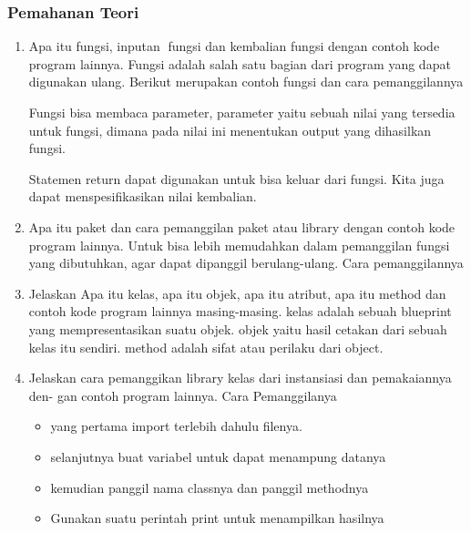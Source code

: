 \subsubsection{Pemahanan Teori}
\begin{enumerate}
    \item Apa itu fungsi, inputan fungsi dan kembalian fungsi dengan contoh kode program
    lainnya.
    Fungsi adalah salah satu bagian dari program yang dapat digunakan ulang.
    Berikut merupakan contoh fungsi dan cara pemanggilannya
    

    Fungsi bisa membaca parameter, parameter yaitu sebuah nilai yang tersedia untuk fungsi, dimana pada nilai ini menentukan output yang dihasilkan fungsi.
    

    Statemen return dapat digunakan untuk bisa keluar dari fungsi. Kita juga dapat menspesifikasikan nilai kembalian.
    

    \item Apa itu paket dan cara pemanggilan paket atau library dengan contoh kode
    program lainnya.
    Untuk bisa lebih memudahkan dalam pemanggilan fungsi yang dibutuhkan, agar dapat dipanggil berulang-ulang.
    Cara pemanggilannya
    

    \item Jelaskan Apa itu kelas, apa itu objek, apa itu atribut, apa itu method dan
    contoh kode program lainnya masing-masing.
    kelas adalah sebuah blueprint yang mempresentasikan suatu objek.
    objek yaitu hasil cetakan dari sebuah kelas itu sendiri.
    method adalah sifat atau perilaku dari object.
    

    \item Jelaskan cara pemanggikan library kelas dari instansiasi dan pemakaiannya den-
    gan contoh program lainnya.
    Cara Pemanggilanya 
    \begin{itemize}
        \item yang pertama import terlebih dahulu filenya.
        \item selanjutnya buat variabel untuk dapat menampung datanya
        \item kemudian panggil nama classnya dan panggil methodnya
        \item Gunakan suatu perintah print untuk menampilkan hasilnya


\end{itemize}
\end{enumerate}
